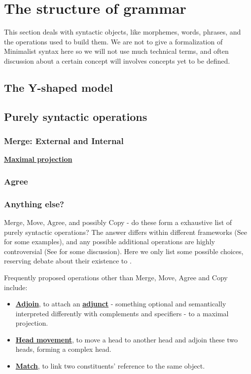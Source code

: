 \documentclass[a4paper]{article}
\newcommand*{\concept}[1]{\underline{\textbf{#1}}}
\begin{document}
\section{The structure of grammar}

This section deals with syntactic objects, like morphemes, words, phrases, and the operations used to build them.
We are not to give a formalization of Minimalist syntax here so we will not use much technical terms, 
and often discussion about a certain concept will involves concepts yet to be defined.

\subsection{The Y-shaped model}

\subsection{Purely syntactic operations}

\subsubsection{Merge: External and Internal}

\concept{Maximal projection}

\subsubsection{Agree}


\subsubsection{Anything else?}

Merge, Move, Agree, and possibly Copy - do these form a exhaustive list of purely syntactic operations? 
The answer differs within different frameworks (See  for some examples), and any possible additional operations are highly controversial (See  for some discussion).
Here we only list some possible choices, reserving debate about their existence to .

Frequently proposed operations other than Merge, Move, Agree and Copy include:

\begin{itemize}
    \item \concept{Adjoin}, to attach an \concept{adjunct} - something optional and semantically interpreted differently with complements and specifiers - to a maximal projection. 
    \item \concept{Head movement}, to move a head to another head and adjoin these two heads, forming a complex head.
    \item \concept{Match}, to link two constituents' reference to the same object.
\end{itemize}
\end{document}
